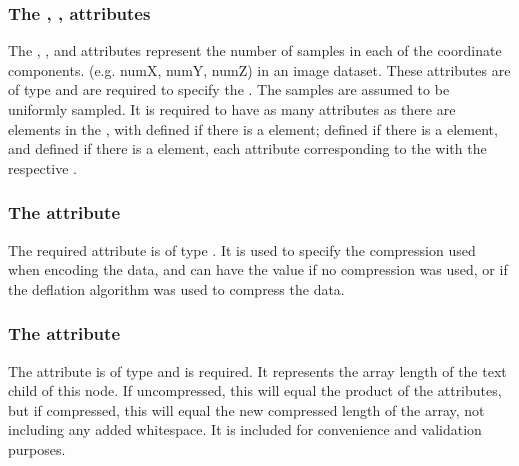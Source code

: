 \subsubsection{The \fixttspace{}, ,  attributes}
The , , and  attributes represent the number of samples in each of the coordinate components. (e.g. numX, numY, numZ) in an image dataset.  These attributes are of type  and are required to specify the \SampledField. The samples are assumed to be uniformly sampled.  It is required to have as many  attributes as there are \CoordinateComponent elements in the \Geometry, with  defined if there is a  element;  defined if there is a  element, and  defined if there is a  element, each attribute corresponding to the \CoordinateComponent with the respective .

\subsubsection{The \fixttspace{} attribute}
The required  attribute is of type . It is used to specify the compression used when encoding the data, and can have the value  if no compression was used, or  if the deflation algorithm was used to compress the data.  


\subsubsection{The \fixttspace{} attribute}
The  attribute is of type  and is required. It represents the array length of the  text child of this node.  If uncompressed, this will equal the product of the  attributes, but if compressed, this will equal the new compressed length of the array, not including any added whitespace.  It is included for convenience and validation purposes.

